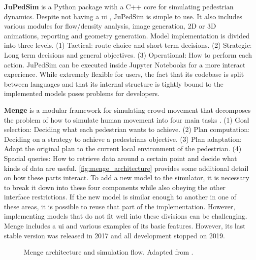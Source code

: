 \documentclass[twoside, 11pt]{article}
\begin{document}
\textbf{JuPedSim} is a Python package with a C++ core for simulating pedestrian dynamics. Despite not having a \gls{ui} \cite{kemlohwagoumJuPedSimOpenFramework2015}, JuPedSim is simple to use. It also includes various modules for flow/density analysis, image generation, 2D or 3D animations, reporting and geometry generation. Model implementation is divided into three levels. (1) Tactical: route choice and short term decisions. (2) Strategic: Long term decisions and general objectives. (3) Operational: How to perform each action. JuPedSim can be executed inside Jupyter Notebooks for a more interact experience. While extremely flexible for users, the fact that its codebase is split between languages and that its internal structure is tightly bound to the implemented models poses problems for developers.

\textbf{Menge} is a modular framework for simulating crowd movement that decomposes the problem of how to simulate human movement into four main tasks \cite{curtisMengeModularFramework2016}. (1) Goal selection: Deciding what each pedestrian wants to achieve. (2) Plan computation: Deciding on a strategy to achieve a pedestrians objective. (3) Plan adaptation: Adapt the original plan to the current local environment of the pedestrian. (4) Spacial queries: How to retrieve data around a certain point and decide what kinds of data are useful. \autoref{fig:menge_architecture} provides some additional detail on how these parts interact. To add a new model to the simulator, it is necessary to break it down into these four components while also obeying the other interface restrictions. If the new model is similar enough to another in one of these areas, it is possible to reuse that part of the implementation. However, implementing models that do not fit well into these divisions can be challenging. Menge includes a \gls{ui} and various examples of its basic features. However, its last stable version was released in 2017 and all development stopped on 2019.

\begin{figure}[h]
  \centering
  
  \caption{Menge architecture and simulation flow. Adapted from \cite{curtisMengeModularFramework2016}.}
  \label{fig:menge_architecture}
\end{figure}
\end{document}

